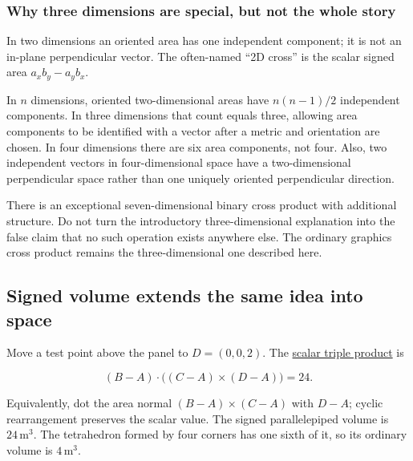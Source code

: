 \subsubsection{Why three dimensions are special, but not the whole story}\label{01-foundations-i-ch017-why-three-dimensions-are-special-but-not-the-whole-story}

\hypertarget{01-foundations-i-ch017-why-three-dimensions-are-special-but-not-the-whole-story}{}

In two dimensions an oriented area has one independent component; it is not an in-plane perpendicular vector. The often-named ``2D cross'' is the scalar signed area \(a_xb_y-a_yb_x\).

In \(n\) dimensions, oriented two-dimensional areas have \(n(n-1)/2\) independent components. In three dimensions that count equals three, allowing area components to be identified with a vector after a metric and orientation are chosen. In four dimensions there are six area components, not four. Also, two independent vectors in four-dimensional space have a two-dimensional perpendicular space rather than one uniquely oriented perpendicular direction.

There is an exceptional seven-dimensional binary cross product with additional structure. Do not turn the introductory three-dimensional explanation into the false claim that no such operation exists anywhere else. The ordinary graphics cross product remains the three-dimensional one described here.

\subsection{Signed volume extends the same idea into space}\label{01-foundations-i-ch017-signed-volume-extends-the-same-idea-into-space}

\hypertarget{01-foundations-i-ch017-signed-volume-extends-the-same-idea-into-space}{}

Move a test point above the panel to \(D=(0,0,2)\). The \hyperref[01-foundations-i-ch017-signed-volume-extends-the-same-idea-into-space]{scalar triple product} is

\[
(B-A)\cdot\big((C-A)\times(D-A)\big)=24.
\]

Equivalently, dot the area normal \((B-A)\times(C-A)\) with \(D-A\); cyclic rearrangement preserves the scalar value. The signed parallelepiped volume is \(24\,\mathrm{m}^3\). The tetrahedron formed by four corners has one sixth of it, so its ordinary volume is \(4\,\mathrm{m}^3\).

